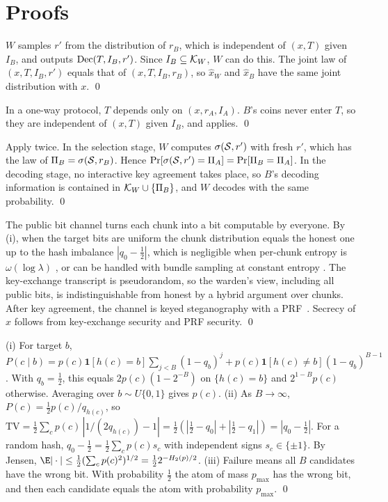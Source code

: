 \section{Proofs}
\label{app:proofs}

$W$ samples $r'$ from the distribution of $r_B$, which is independent of $(x,T)$ given $I_B$, and outputs $\mathrm{Dec}(T, I_B, r')$. Since $I_B \subseteq \mathcal{K}_W$, $W$ can do this. The joint law of $(x, T, I_B, r')$ equals that of $(x, T, I_B, r_B)$, so $\hat{x}_W$ and $\hat{x}_B$ have the same joint distribution with $x$. \qed

In a one-way protocol, $T$ depends only on $(x, r_A, I_A)$. $B$'s coins never enter $T$, so they are independent of $(x,T)$ given $I_B$, and  applies. \qed

Apply  twice. In the selection stage, $W$ computes $\sigma(\mathcal{S}, r')$ with fresh $r'$, which has the law of $\Pi_B = \sigma(\mathcal{S}, r_B)$. Hence $\Pr[\sigma(\mathcal{S}, r') = \Pi_A] = \Pr[\Pi_B = \Pi_A]$. In the decoding stage, no interactive key agreement takes place, so $B$'s decoding information is contained in $\mathcal{K}_W \cup \{\Pi_B\}$, and $W$ decodes with the same probability. \qed

The public bit channel turns each chunk into a bit computable by everyone. By (i), when the target bits are uniform the chunk distribution equals the honest one up to the hash imbalance $|q_0-\tfrac12|$, which is negligible when per-chunk entropy is $\omega(\log\lambda)$ \citep{vonahn2004public}, or can be handled with bundle sampling at constant entropy \citep{vaikuntanathan2026undetectable}. The key-exchange transcript is pseudorandom, so the warden's view, including all public bits, is indistinguishable from honest by a hybrid argument over chunks. After key agreement, the channel is keyed steganography with a PRF~\citep{hopper2002provably}. Secrecy of $x$ follows from key-exchange security and PRF security. \qed

(i) For target $b$, $P(c\mid b) = p(c)\mathbf{1}[h(c)=b]\sum_{j<B}(1-q_b)^j + p(c)\mathbf{1}[h(c)\neq b](1-q_b)^{B-1}$. With $q_b=\tfrac12$, this equals $2p(c)(1-2^{-B})$ on $\{h(c)=b\}$ and $2^{1-B}p(c)$ otherwise. Averaging over $b \sim U\{0,1\}$ gives $p(c)$.
(ii) As $B\to\infty$, $P(c) = \tfrac12 p(c)/q_{h(c)}$, so $\mathrm{TV} = \tfrac12\sum_c p(c)\,|1/(2q_{h(c)}) - 1| = \tfrac12(|\tfrac12-q_0| + |\tfrac12-q_1|) = |q_0-\tfrac12|$. For a random hash, $q_0-\tfrac12 = \tfrac12\sum_c p(c)s_c$ with independent signs $s_c\in\{\pm1\}$. By Jensen, $\E|\cdot| \leq \tfrac12(\sum_c p(c)^2)^{1/2} = \tfrac12 2^{-H_2(p)/2}$.
(iii) Failure means all $B$ candidates have the wrong bit. With probability $\tfrac12$ the atom of mass $p_{\max}$ has the wrong bit, and then each candidate equals the atom with probability $p_{\max}$. \qed

